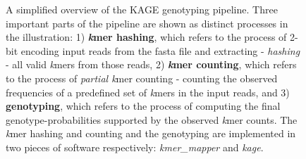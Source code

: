 \begin{figure}[H]
\begin{center}
{
}
\caption{
  A simplified overview of the KAGE genotyping pipeline.
  Three important parts of the pipeline are shown as distinct processes in the illustration: 
  1) \textbf{\textit{k}mer hashing}, which refers to the process of 2-bit encoding input reads from the fasta file and extracting - \textit{hashing} - all valid \textit{k}mers from those reads, 
  2) \textbf{\textit{k}mer counting}, which refers to the process of \textit{partial k}mer counting - counting the observed frequencies of a predefined set of \textit{k}mers in the input reads, and 
  3) \textbf{genotyping}, which refers to the process of computing the final genotype-probabilities supported by the observed \textit{k}mer counts.
  The \textit{k}mer hashing and counting and the genotyping are implemented in two pieces of software respectively: \textit{kmer\_mapper} and \textit{kage}.
}
\label{background:kage:figures:pipeline}
\end{center}
\end{figure}

